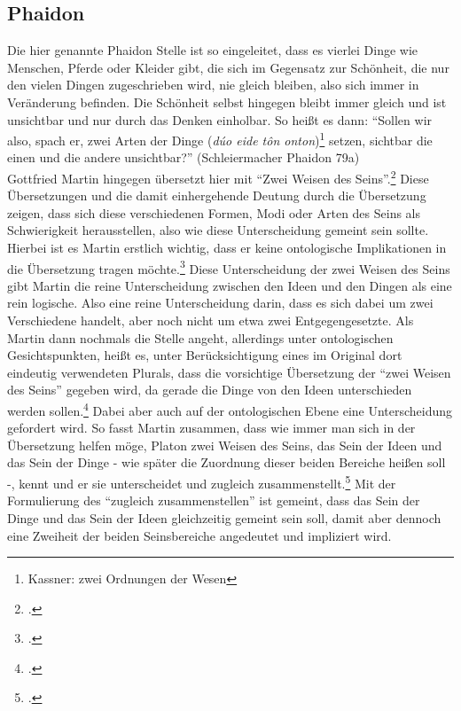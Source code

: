 \subsection{Phaidon}
Die hier genannte Phaidon Stelle ist so eingeleitet, dass es vierlei Dinge wie Menschen, Pferde oder Kleider gibt, die sich im Gegensatz zur Schönheit, die nur den vielen Dingen zugeschrieben wird, nie gleich bleiben, also sich immer in Veränderung befinden. Die Schönheit selbst hingegen bleibt immer gleich und ist unsichtbar und nur durch das Denken einholbar.
So heißt es dann: \enquote{Sollen wir also, spach er, zwei Arten der Dinge (\emph{dúo eide tôn onton})\footnote{Kassner: zwei Ordnungen der Wesen\nocite{PhaidonKassner}} setzen, sichtbar die einen und die andere unsichtbar?} (Schleiermacher \nocite{PhaidonSchleiermacher}Phaidon 79a)\\
Gottfried Martin hingegen übersetzt hier mit \enquote{Zwei Weisen des Seins}.\footcite[vgl.][S. 38]{Martin73}
Diese Übersetzungen und die damit einhergehende Deutung durch die Übersetzung zeigen, dass sich diese verschiedenen Formen, Modi oder Arten des Seins als Schwierigkeit herausstellen, also wie diese Unterscheidung gemeint sein sollte. Hierbei ist es Martin erstlich wichtig, dass er keine ontologische Implikationen in die Übersetzung tragen möchte.\footcite[vgl.][S. 37]{Martin73} Diese Unterscheidung der zwei Weisen des Seins gibt Martin die reine Unterscheidung zwischen den Ideen und den Dingen als eine rein logische. Also eine reine Unterscheidung darin, dass es sich dabei um zwei Verschiedene handelt, aber noch nicht um etwa zwei Entgegengesetzte.
Als Martin dann nochmals die Stelle angeht, allerdings unter ontologischen Gesichtspunkten, heißt es, unter Berücksichtigung eines im Original dort eindeutig verwendeten Plurals, dass die vorsichtige Übersetzung der \enquote{zwei Weisen des Seins} gegeben wird, da gerade die Dinge von den Ideen unterschieden werden sollen.\footcite[vgl.][S. 216]{Martin73} Dabei aber auch auf der ontologischen Ebene eine Unterscheidung gefordert wird. So fasst Martin zusammen, dass wie immer man sich in der Übersetzung helfen möge, Platon zwei Weisen des Seins, das Sein der Ideen und das Sein der Dinge - wie später die Zuordnung dieser beiden Bereiche heißen soll -, kennt und er sie unterscheidet und zugleich zusammenstellt.\footcite[vgl.][S. 216]{Martin73}
Mit der Formulierung des \enquote{zugleich zusammenstellen} ist gemeint, dass das Sein der Dinge und das Sein der Ideen gleichzeitig gemeint sein soll, damit aber dennoch eine Zweiheit der beiden Seinsbereiche angedeutet und impliziert wird.
